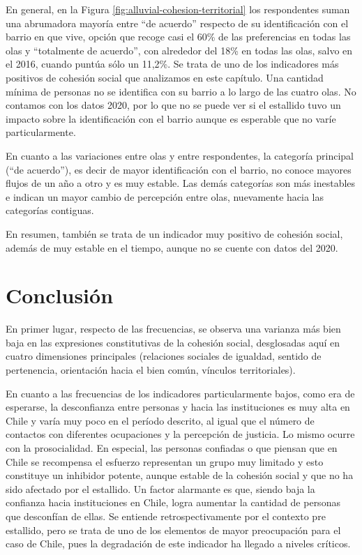 \documentclass[
  12pt,
]{book}
\begin{document}
En general, en la Figura \ref{fig:alluvial-cohesion-territorial} los respondentes suman una abrumadora mayoría entre ``de acuerdo'' respecto de su identificación con el barrio en que vive, opción que recoge casi el 60\% de las preferencias en todas las olas y ``totalmente de acuerdo'', con alrededor del 18\% en todas las olas, salvo en el 2016, cuando puntúa sólo un 11,2\%. Se trata de uno de los indicadores más positivos de cohesión social que analizamos en este capítulo. Una cantidad mínima de personas no se identifica con su barrio a lo largo de las cuatro olas. No contamos con los datos 2020, por lo que no se puede ver si el estallido tuvo un impacto sobre la identificación con el barrio aunque es esperable que no varíe particularmente.

En cuanto a las variaciones entre olas y entre respondentes, la categoría principal (``de acuerdo''), es decir de mayor identificación con el barrio, no conoce mayores flujos de un año a otro y es muy estable. Las demás categorías son más inestables e indican un mayor cambio de percepción entre olas, nuevamente hacia las categorías contiguas.

En resumen, también se trata de un indicador muy positivo de cohesión social, además de muy estable en el tiempo, aunque no se cuente con datos del 2020.

\hypertarget{conclusiuxf3n}{%
\section{Conclusión}\label{conclusiuxf3n}}

En primer lugar, respecto de las frecuencias, se observa una varianza más bien baja en las expresiones constitutivas de la cohesión social, desglosadas aquí en cuatro dimensiones principales (relaciones sociales de igualdad, sentido de pertenencia, orientación hacia el bien común, vínculos territoriales).

En cuanto a las frecuencias de los indicadores particularmente bajos, como era de esperarse, la desconfianza entre personas y hacia las instituciones es muy alta en Chile y varía muy poco en el período descrito, al igual que el número de contactos con diferentes ocupaciones y la percepción de justicia. Lo mismo ocurre con la prosocialidad. En especial, las personas confiadas o que piensan que en Chile se recompensa el esfuerzo representan un grupo muy limitado y esto constituye un inhibidor potente, aunque estable de la cohesión social y que no ha sido afectado por el estallido. Un factor alarmante es que, siendo baja la confianza hacia instituciones en Chile, logra aumentar la cantidad de personas que desconfían de ellas. Se entiende retrospectivamente por el contexto pre estallido, pero se trata de uno de los elementos de mayor preocupación para el caso de Chile, pues la degradación de este indicador ha llegado a niveles críticos.
\end{document}
